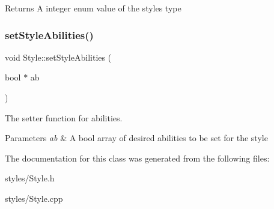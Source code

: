 \begin{DoxyReturn}{Returns}
A integer enum value of the style\textquotesingle{}s type 
\end{DoxyReturn}
\mbox{\label{class_style_aab96b000dda90385c6e3bc8a3aa07c6a}} 
\subsubsection{\texorpdfstring{setStyleAbilities()}{setStyleAbilities()}}
{\footnotesize\ttfamily void Style\+::set\+Style\+Abilities (\begin{DoxyParamCaption}\item[{bool $\ast$}]{ab }\end{DoxyParamCaption})}



The setter function for abilities. 


\begin{DoxyParams}{Parameters}
{\em ab} & A bool array of desired abilities to be set for the style \\
\hline
\end{DoxyParams}


The documentation for this class was generated from the following files\+:\begin{DoxyCompactItemize}
\item 
styles/Style.\+h\item 
styles/Style.\+cpp\end{DoxyCompactItemize}
